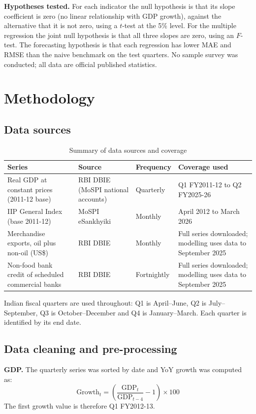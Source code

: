 \documentclass[11pt, a4paper]{article}
\begin{document}
\textbf{Hypotheses tested.} For each indicator the null hypothesis is that its slope coefficient is zero (no linear relationship with GDP growth), against the alternative that it is not zero, using a $t$-test at the 5\% level. For the multiple regression the joint null hypothesis is that all three slopes are zero, using an $F$-test. The forecasting hypothesis is that each regression has lower MAE and RMSE than the naive benchmark on the test quarters. No sample survey was conducted; all data are official published statistics.

\section{Methodology}

\subsection{Data sources}
\begin{table}[h!]
\centering
\small
\renewcommand{\arraystretch}{1.3}
\begin{tabularx}{\textwidth}{>{\raggedright\arraybackslash}p{4.0cm} >{\raggedright\arraybackslash}p{3.4cm} l >{\raggedright\arraybackslash}X}
\toprule
\textbf{Series} & \textbf{Source} & \textbf{Frequency} & \textbf{Coverage used} \\
\midrule
Real GDP at constant prices (2011-12 base) & RBI DBIE (MoSPI national accounts) & Quarterly & Q1 FY2011-12 to Q2 FY2025-26 \\
IIP General Index (base 2011-12) & MoSPI eSankhyiki & Monthly & April 2012 to March 2026 \\
Merchandise exports, oil plus non-oil (US\$) & RBI DBIE & Monthly & Full series downloaded; modelling uses data to September 2025 \\
Non-food bank credit of scheduled commercial banks & RBI DBIE & Fortnightly & Full series downloaded; modelling uses data to September 2025 \\
\bottomrule
\end{tabularx}
\caption{Summary of data sources and coverage}
\end{table}

Indian fiscal quarters are used throughout: Q1 is April--June, Q2 is July--September, Q3 is October--December and Q4 is January--March. Each quarter is identified by its end date.

\subsection{Data cleaning and pre-processing}
\textbf{GDP.} The quarterly series was sorted by date and YoY growth was computed as:
\[
\text{Growth}_t = \left(\frac{\text{GDP}_t}{\text{GDP}_{t-4}} - 1\right) \times 100
\]
The first growth value is therefore Q1 FY2012-13.
\end{document}
